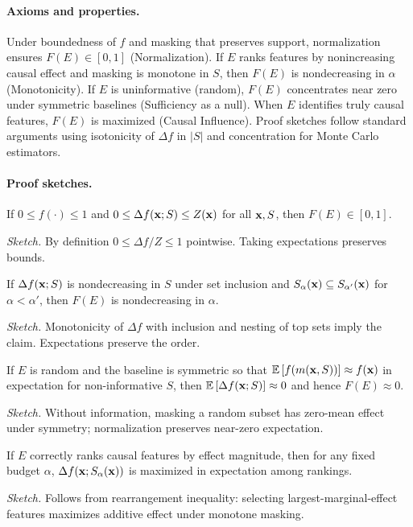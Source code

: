 \paragraph{Axioms and properties.}
Under boundedness of $f$ and masking that preserves support, normalization ensures $F(E)\in[0,1]$ (Normalization). If $E$ ranks features by nonincreasing causal effect and masking is monotone in $S$, then $F(E)$ is nondecreasing in $\alpha$ (Monotonicity). If $E$ is uninformative (random), $F(E)$ concentrates near zero under symmetric baselines (Sufficiency as a null). When $E$ identifies truly causal features, $F(E)$ is maximized (Causal Influence). Proof sketches follow standard arguments using isotonicity of $\Delta f$ in $|S|$ and concentration for Monte Carlo estimators.

\paragraph{Proof sketches.}
\begin{proposition}[Normalization]
If $0 \le f(\cdot) \le 1$ and $0\le \Delta f(\mathbf{x};S) \le Z(\mathbf{x})$ for all $\mathbf{x},S$, then $F(E)\in[0,1]$.
\end{proposition}
\emph{Sketch.} By definition $0\le \Delta f/Z\le 1$ pointwise. Taking expectations preserves bounds.

\begin{proposition}[Monotonicity]
If $\Delta f(\mathbf{x};S)$ is nondecreasing in $S$ under set inclusion and $S_\alpha(\mathbf{x})\subseteq S_{\alpha'}(\mathbf{x})$ for $\alpha<\alpha'$, then $F(E)$ is nondecreasing in $\alpha$.
\end{proposition}
\emph{Sketch.} Monotonicity of $\Delta f$ with inclusion and nesting of top sets imply the claim. Expectations preserve the order.

\begin{proposition}
If $E$ is random and the baseline is symmetric so that $\mathbb{E}\left[  f(m(\mathbf{x},S))  \right]\approx f(\mathbf{x})$ in expectation for non-informative $S$, then $\mathbb{E}\left[ \Delta f(\mathbf{x};S) \right]\approx 0$ and hence $F(E)\approx 0$.
\end{proposition}
\emph{Sketch.} Without information, masking a random subset has zero-mean effect under symmetry; normalization preserves near-zero expectation.

\begin{proposition}
If $E$ correctly ranks causal features by effect magnitude, then for any fixed budget $\alpha$, $\Delta f(\mathbf{x};S_\alpha(\mathbf{x}))$ is maximized in expectation among rankings.
\end{proposition}
\emph{Sketch.} Follows from rearrangement inequality: selecting largest-marginal-effect features maximizes additive effect under monotone masking.

